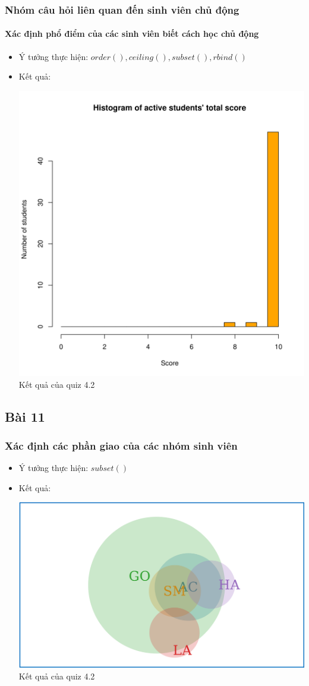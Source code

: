 \documentclass[english,10pt,table]{beamer}
\begin{document}
\frame
{
\frametitle{Nhóm câu hỏi liên quan đến sinh viên chủ động}
\framesubtitle{Xác định phổ điểm của các sinh viên biết cách học chủ động}
\begin{itemize}
    \item Ý tưởng thực hiện: $order(), ceiling(), subset(), rbind()$
    \item Kết quả:\\
    \begin{center}
        \includegraphics[width = 6 cm]{Images/img10-1-4.png}\\
        Kết quả của quiz 4.2
    \end{center}
\end{itemize}
}

\subsection{Bài 11}

\frame
{
\frametitle{Xác định các phần giao của các nhóm sinh viên}
\begin{itemize}
    \item Ý tưởng thực hiện: $subset()$
    \item Kết quả:\\
    \begin{center}
        \includegraphics[width = 8 cm]{Images/img11-1-4.png}\\
        Kết quả của quiz 4.2
    \end{center}
\end{itemize}
}
\end{document}
